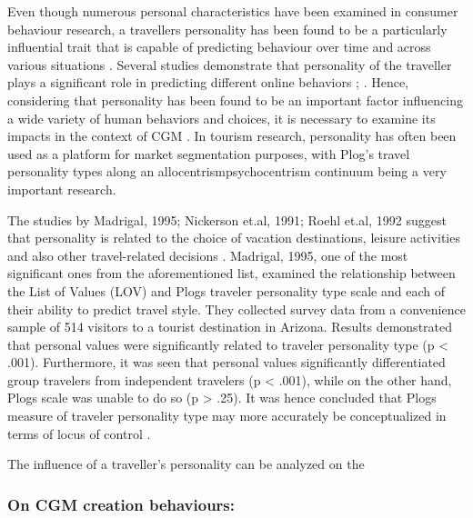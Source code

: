 Even though numerous personal characteristics have been examined in consumer behaviour research, a traveller\textquotesingle s personality has been found to be a particularly influential trait that is capable of predicting behaviour over time and across various situations \cite{woszczynski2002exploring}. Several studies demonstrate that personality of the traveller plays a significant role in predicting different online behaviors\cite{yoo2011influence} \cite{acar2007online}; \cite{tuten2001understanding}. Hence, considering that personality has been found to be an important factor influencing a wide variety of human behaviors and choices, it is necessary to examine its impacts in the context of CGM \cite{yoo2011influence}. In tourism research, personality has often been used as a platform for market segmentation purposes, with Plog’s travel personality types along an allocentrism\textemdash psychocentrism continuum being a very important research\cite{plog1973destination}\cite{yoo2011influence}.

The studies by Madrigal, 1995; Nickerson et.al, 1991; Roehl et.al, 1992 suggest that personality is related to the choice of vacation destinations, leisure activities and also other travel-related decisions \cite{madrigal1995personal}\cite{nickerson1991traveler}\cite{roehl1992risk}. Madrigal, 1995, one of the most significant ones from the aforementioned list, examined the relationship between the List of Values (LOV) and Plog\textquotesingle s traveler personality type scale and each of their ability to predict travel style. They collected survey data from a convenience sample of 514 visitors to a tourist destination in Arizona. Results demonstrated that personal values were significantly related to traveler personality type (p < .001). Furthermore, it was seen that personal values significantly differentiated group travelers from independent travelers (p < .001), while on the other hand, Plog\textquotesingle s scale was unable to do so (p > .25). It was hence concluded that Plog\textquotesingle s measure of traveler personality type may more accurately be conceptualized in terms of locus of control \cite{madrigal1995personal}.

The influence of a traveller's personality can be analyzed on the 
\subsubsection{On CGM creation behaviours: }

